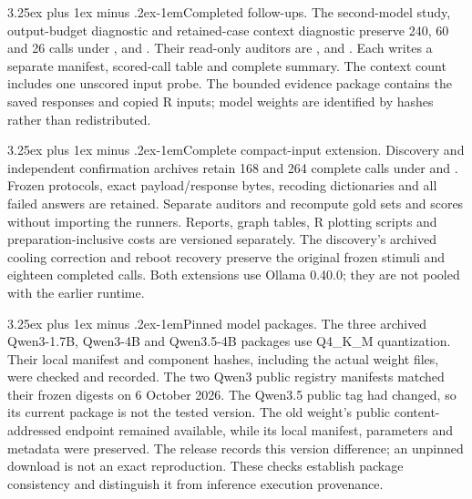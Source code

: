 \documentclass[10pt]{article}
\makeatletter
\renewcommand\paragraph{\@startsection{paragraph}{4}{\parindent}%
  {3.25ex plus 1ex minus .2ex}{-1em}{\normalfont\normalsize\bfseries}}
\makeatother
\begin{document}
\paragraph{Completed follow-ups.} The second-model study, output-budget diagnostic and retained-case context diagnostic preserve 240, 60 and 26 calls under \protect{}, \protect{} and \protect{}. Their read-only auditors are \protect{}, \protect{} and \protect{}. Each writes a separate manifest, scored-call table and complete summary. The context count includes one unscored input probe. The bounded evidence package contains the saved responses and copied R inputs; model weights are identified by hashes rather than redistributed.

\paragraph{Complete compact-input extension.} Discovery and independent confirmation archives retain 168 and 264 complete calls under \protect{} and \protect{}. Frozen protocols, exact payload/response bytes, recoding dictionaries and all failed answers are retained. Separate auditors \protect{} and \protect{} recompute gold sets and scores without importing the runners. Reports, graph tables, R plotting scripts and preparation-inclusive costs are versioned separately. The discovery's archived cooling correction and reboot recovery preserve the original frozen stimuli and eighteen completed calls. Both extensions use Ollama 0.40.0; they are not pooled with the earlier runtime.

\paragraph{Pinned model packages.} The three archived Qwen3-1.7B, Qwen3-4B and Qwen3.5-4B packages use Q4\_K\_M quantization. Their local manifest and component hashes, including the actual weight files, were checked and recorded. The two Qwen3 public registry manifests matched their frozen digests on 6 October 2026. The Qwen3.5 public tag had changed, so its current package is not the tested version. The old weight's public content-addressed endpoint remained available, while its local manifest, parameters and metadata were preserved. The release records this version difference; an unpinned download is not an exact reproduction. These checks establish package consistency and distinguish it from inference execution provenance.
\end{document}

